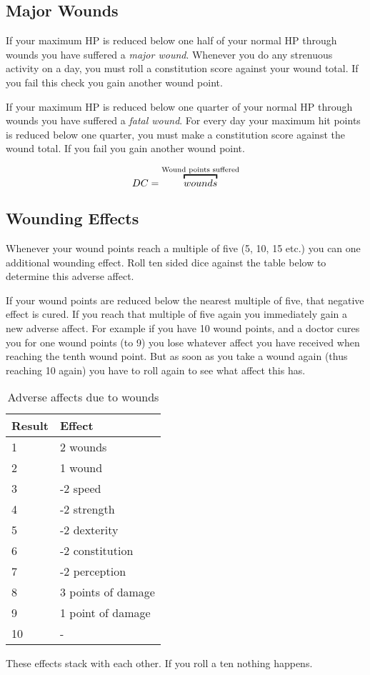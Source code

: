 \subsection{Major Wounds}

If your maximum HP is reduced below one half of your normal HP through wounds
you have suffered a \emph{major wound}. Whenever you do any strenuous activity on
a day, you must roll a constitution score against your wound total. If you fail
this check you gain another wound point.

If your maximum HP is reduced below one quarter of your normal HP through wounds
you have suffered a \emph{fatal wound}. For every day your maximum hit points is
reduced below one quarter, you must make a constitution score against the wound
total. If you fail you gain another wound point.

\[
DC = \ob{wounds}{Wound points suffered}
\]

\subsection{Wounding Effects}

Whenever your wound points reach a multiple of five (5, 10, 15 etc.) you can
one additional wounding effect. Roll ten sided dice against the table below to
determine this adverse affect.

If your wound points are reduced below the nearest multiple of five, that
negative effect is cured. If you reach that multiple of five again you
immediately gain a new adverse affect. For example if you have 10 wound
points, and a doctor cures you for one wound points (to 9) you lose whatever
affect you have received when reaching the tenth wound point. But as soon as
you take a wound again (thus reaching 10 again) you have to roll again to see
what affect this has.

\begin{table}
  \caption{Adverse affects due to wounds}
  \begin{center}
    \begin{tabular}{|l|l|}
      \hline
      Result & Effect             \\ \hline
      1      & 2 wounds           \\ \hline
      2      & 1 wound            \\ \hline
      3      & -2 speed           \\ \hline
      4      & -2 strength        \\ \hline
      5      & -2 dexterity       \\ \hline
      6      & -2 constitution    \\ \hline
      7      & -2 perception      \\ \hline
      8      & 3 points of damage \\ \hline
      9      & 1 point of damage  \\ \hline
      10     & -                  \\ \hline
    \end{tabular}
  \end{center}
\end{table}

These effects stack with each other. If you roll a ten nothing happens.
